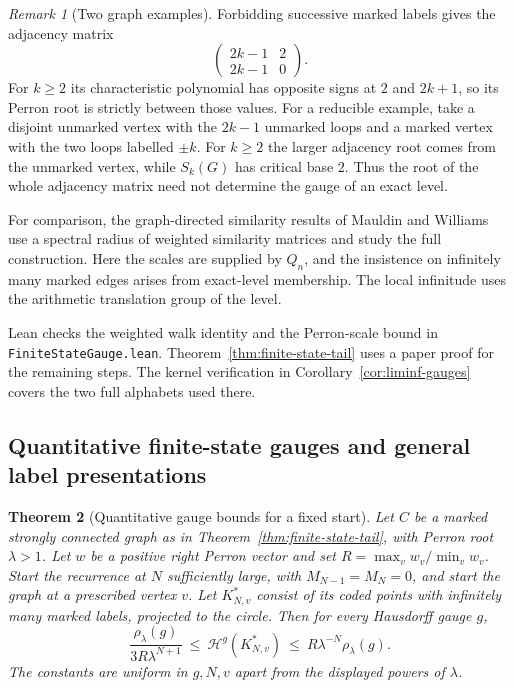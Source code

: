 \documentclass[11pt]{article}
\newtheorem{theorem}{Theorem}
\theoremstyle{definition}
\theoremstyle{remark}
\newtheorem{remark}[theorem]{Remark}
\begin{document}
\begin{remark}[Two graph examples]
Forbidding successive marked labels gives the adjacency matrix
\[
 \begin{pmatrix}2k-1&2\\2k-1&0\end{pmatrix}.
\]
For $k\ge2$ its characteristic polynomial has opposite signs at $2$
and $2k+1$, so its Perron root is strictly between those values.
For a reducible example, take a disjoint unmarked vertex with the
$2k-1$ unmarked loops and a marked vertex with the two loops labelled
$\pm k$. For $k\ge2$ the larger adjacency root comes from the unmarked
vertex, while $S_k(G)$ has critical base $2$. Thus the root of the
whole adjacency matrix need not determine the gauge of an exact level.
\end{remark}

For comparison, the graph-directed similarity results of Mauldin
and Williams \cite[Theorems~3 and~4]{MW} use a spectral radius of weighted
similarity matrices and study the full construction. Here the scales
are supplied by $Q_n$, and the insistence on infinitely many marked
edges arises from exact-level membership. The local infinitude uses
the arithmetic translation group of the level.

Lean checks the weighted walk identity and the Perron-scale bound in
\texttt{Finite\allowbreak State\allowbreak Gauge.lean}. Theorem~\ref{thm:finite-state-tail}
uses a paper proof for the remaining steps. The kernel
verification in Corollary~\ref{cor:liminf-gauges} covers the two full
alphabets used there.

\subsection{Quantitative finite-state gauges and general label presentations}

\begin{theorem}[Quantitative gauge bounds for a fixed start]\label{thm:finite-state-quant}
Let $C$ be a marked strongly connected graph as in
Theorem~\ref{thm:finite-state-tail}, with Perron root $\lambda>1$.
Let $w$ be a positive right Perron vector and set
$R=\max_v w_v/\min_v w_v$.
Start the recurrence at $N$ sufficiently large, with
$M_{N-1}=M_N=0$, and start the graph at a prescribed vertex $v$.
Let $K^*_{N,v}$ consist of its coded points with infinitely many
marked labels, projected to the circle. Then for every Hausdorff gauge $g$,
\[
 \frac{\rho_\lambda(g)}{3R\lambda^{N+1}}
 \ \le\ \mathcal H^g(K^*_{N,v})
 \ \le\ R\lambda^{-N}\rho_\lambda(g).
\]
The constants are uniform in $g,N,v$ apart from the displayed powers
of $\lambda$.
\end{theorem}
\end{document}
